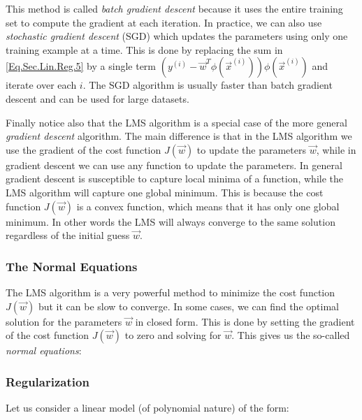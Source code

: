 \begin{remark}
	This method is called \emph{batch gradient descent} because it uses the entire training set to compute the gradient at each iteration. In practice, we can also use \emph{stochastic gradient descent} (SGD) which updates the parameters using only one training example at a time. This is done by replacing the sum in \cref{Eq.Sec.Lin.Reg.5} by a single term $(y^{(i)} - \vec{w}^T\phi(\vec{x}^{(i)}))\phi(\vec{x}^{(i)})$ and iterate over each $i$. The SGD algorithm is usually faster than batch gradient descent and can be used for large datasets. 
\end{remark}

Finally notice also that the LMS algorithm is a special case of the more general \emph{gradient descent} algorithm. The main difference is that in the LMS algorithm we use the gradient of the cost function $J(\vec{w})$ to update the parameters $\vec{w}$, while in gradient descent we can use any function to update the parameters. In general gradient descent is susceptible to capture local minima of a function, while the LMS algorithm will capture one global minimum. This is because the cost function $J(\vec{w})$ is a convex function, which means that it has only one global minimum. In other words the LMS will always converge to the same solution regardless of the initial guess $\vec{w}$. 

\subsubsection{The Normal Equations}
The LMS algorithm is a very powerful method to minimize the cost function $J(\vec{w})$ but it can be slow to converge. In some cases, we can find the optimal solution for the parameters $\vec{w}$ in closed form. This is done by setting the gradient of the cost function $J(\vec{w})$ to zero and solving for $\vec{w}$. This gives us the so-called \emph{normal equations}:


\subsubsection{Regularization}

Let us consider a linear model (of polynomial nature) of the form: 

